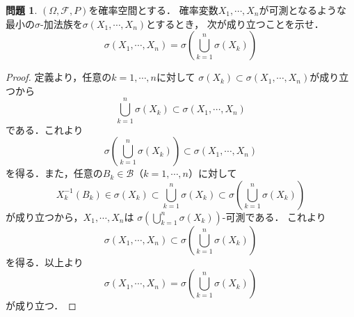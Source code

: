 \documentclass{jsarticle}
\theoremstyle{definition}
\newtheorem{qst}{問題}
\begin{document}
\begin{qst}
$(\Omega,\mathcal{F},P)$を確率空間とする．
確率変数$X_1,\cdots,X_n$が可測となるような
最小の$\sigma$-加法族を$\sigma(X_1,\cdots,X_n)$とするとき，
次が成り立つことを示せ．
\[ \sigma(X_1,\cdots,X_n)=\sigma\left(\bigcup_{k=1}^n\sigma(X_k)\right) \]
\end{qst}
\begin{proof}
定義より，任意の$k=1,\cdots,n$に対して
$\sigma(X_k)\subset\sigma(X_1,\cdots,X_n)$が成り立つから
\[ \bigcup_{k=1}^n\sigma(X_k)\subset\sigma(X_1,\cdots,X_n) \]
である．これより
\[ \sigma\left(\bigcup_{k=1}^n\sigma(X_k)\right)\subset\sigma(X_1,\cdots,X_n) \]
を得る．また，任意の$B_k\in\mathcal{B}$（$k=1,\cdots,n$）に対して
\[ X_k^{-1}(B_k)\in\sigma(X_k)\subset\bigcup_{k=1}^n\sigma(X_k)
\subset\sigma\left(\bigcup_{k=1}^n\sigma(X_k)\right) \]
が成り立つから，$X_1,\cdots,X_n$は
$\displaystyle\sigma\left(\bigcup_{k=1}^n\sigma(X_k)\right)$-可測である．
これより
\[ \sigma(X_1,\cdots,X_n)\subset\sigma\left(\bigcup_{k=1}^n\sigma(X_k)\right) \]
を得る．以上より
\[ \sigma(X_1,\cdots,X_n)=\sigma\left(\bigcup_{k=1}^n\sigma(X_k)\right) \]
が成り立つ．
\end{proof}
\end{document}
